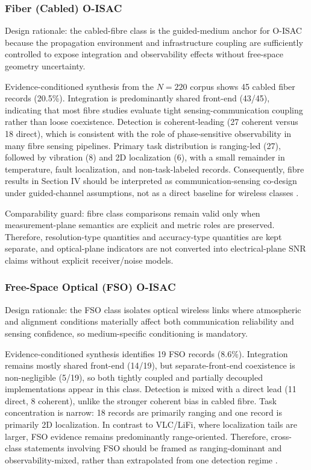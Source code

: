 \documentclass[lettersize,journal]{IEEEtran}
\begin{document}
\subsubsection{Fiber (Cabled) O-ISAC}
Design rationale: the cabled-fibre class is the guided-medium anchor for O-ISAC because the propagation environment and infrastructure coupling are sufficiently controlled to expose integration and observability effects without free-space geometry uncertainty.

Evidence-conditioned synthesis from the $N=220$ corpus shows 45 cabled fiber records (20.5\%). Integration is predominantly shared front-end (43/45), indicating that most fibre studies evaluate tight sensing-communication coupling rather than loose coexistence. Detection is coherent-leading (27 coherent versus 18 direct), which is consistent with the role of phase-sensitive observability in many fibre sensing pipelines. Primary task distribution is ranging-led (27), followed by vibration (8) and 2D localization (6), with a small remainder in temperature, fault localization, and non-task-labeled records. Consequently, fibre results in Section IV should be interpreted as communication-sensing co-design under guided-channel assumptions, not as a direct baseline for wireless classes \cite{O_ISAC_006,O_ISAC_033,O_ISAC_046,O_ISAC_041,O_ISAC_090}.

Comparability guard: fibre class comparisons remain valid only when measurement-plane semantics are explicit and metric roles are preserved. Therefore, resolution-type quantities and accuracy-type quantities are kept separate, and optical-plane indicators are not converted into electrical-plane SNR claims without explicit receiver/noise models.

\subsubsection{Free-Space Optical (FSO) O-ISAC}
Design rationale: the FSO class isolates optical wireless links where atmospheric and alignment conditions materially affect both communication reliability and sensing confidence, so medium-specific conditioning is mandatory.

Evidence-conditioned synthesis identifies 19 FSO records (8.6\%). Integration remains mostly shared front-end (14/19), but separate-front-end coexistence is non-negligible (5/19), so both tightly coupled and partially decoupled implementations appear in this class. Detection is mixed with a direct lead (11 direct, 8 coherent), unlike the stronger coherent bias in cabled fibre. Task concentration is narrow: 18 records are primarily ranging and one record is primarily 2D localization. In contrast to VLC/LiFi, where localization tails are larger, FSO evidence remains predominantly range-oriented. Therefore, cross-class statements involving FSO should be framed as ranging-dominant and observability-mixed, rather than extrapolated from one detection regime \cite{O_ISAC_021,O_ISAC_035,O_ISAC_005,O_ISAC_023,O_ISAC_199}.
\end{document}
